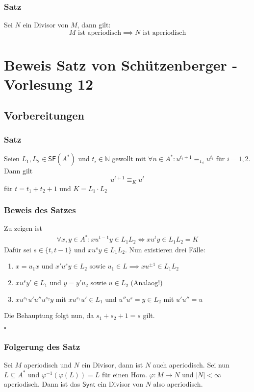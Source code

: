 \documentclass[12pt, german]{article}
\newcommand{\N}{\mathbb{N}}
\newcommand{\inv}{^{-1}}
\newcommand{\starfree}{\mathsf{SF}}
\newcommand{\synt}{\mathsf{Synt}}
\newcommand{\aast}{A^{\ast}}
\newcommand{\bewiesen}{
	
	\begin{flushright}
		$\square$  \\
\end{flushright}}
\begin{document}
	\subsubsection{Satz}
	Sei $N$ ein Divisor von $M$, dann gilt: $$M \text{ ist aperiodisch} \implies N \text{ ist aperiodisch}$$
	
	\section{Beweis Satz von Schützenberger - Vorlesung 12}
	\subsection{Vorbereitungen}
	\subsubsection{Satz}
	Seien $L_1, L_2 \in \starfree(\aast)$ und $t_i \in \N$ gewollt mit $\forall n \in \aast: u^{t_i +1} \equiv_{L_i} u^{t_i}$ für $i = 1,2$.
	Dann gilt $$u^{t+1} \equiv_K u^t$$ für $t = t_1 +t _2 +1$ und $K = L_1 \cdot L_2$
	
	\subsubsection{Beweis des Satzes}
	Zu zeigen ist 
	\begin{align*}
		\forall x,y \in \aast: xu^{t-1}y \in L_1L_2 \iff  xu^{t}y \in L_1L_2 = K
	\end{align*}
	Dafür sei $s \in \{t, t-1\}$ und $xu^sy \in L_1L_2$. Nun existieren drei Fälle: 
	\begin{enumerate}[label= \arabic*.]
		\item $x=u_1x$ und $x'u^sy \in L_2$ sowie $u_1 \in L \implies xu^{\pm1} \in L_1L_2$ 
		\item $xu^sy' \in L_1$ und $y = y'u_2$ sowie $u \in L_2$ (Analaog!)
		\item $xu^{s_1}u'u''u^{s_2}y$ mit $xu^{s_1}u' \in L_1$ und $u''u^s= y \in L_2$ mit $u'u'' = u$
	\end{enumerate}
	Die Behauptung folgt nun, da $s_1 + s_2 + 1 = s$ gilt.
	\bewiesen
	
	\subsubsection{Folgerung des Satz}
	Sei $M$ aperiodisch und $N$ ein Divisor, dann ist $N$ auch aperiodisch. 
	Sei nun $L \subseteq \aast$ und $\varphi\inv(\varphi(L))= L$ für einen Hom. $\varphi: M \to N$ und $|N| < \infty$ aperiodisch. 
	Dann ist das $\synt$ ein Divisor von $N$ also aperiodisch. 
	
\end{document}
